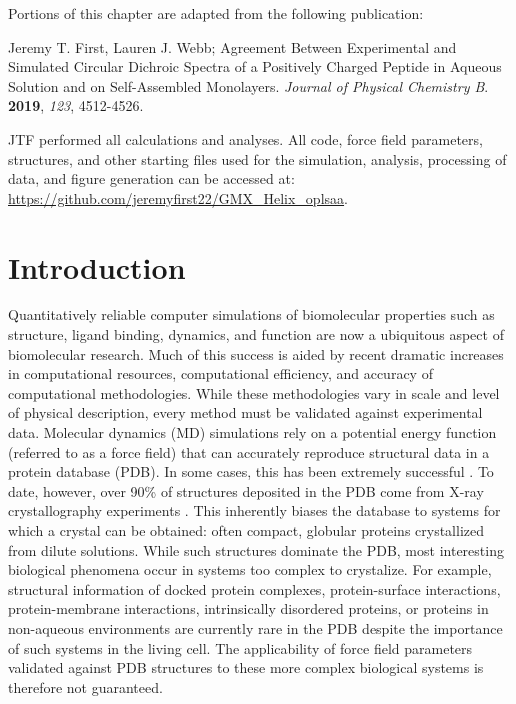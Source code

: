 Portions of this chapter are adapted from the following publication: 

\noindent Jeremy T. First, Lauren J. Webb; Agreement Between Experimental and Simulated Circular Dichroic Spectra of a Positively Charged Peptide in Aqueous Solution and on Self-Assembled Monolayers. \emph{Journal of Physical Chemistry B}. \textbf{2019}, \emph{123}, 4512-4526.

JTF performed all calculations and analyses. 
All code, force field parameters, structures, and other starting files used for the simulation, analysis, processing of data, and figure generation can be accessed at:
\url{https://github.com/jeremyfirst22/GMX_Helix_oplsaa}. 

\section{Introduction}

Quantitatively reliable computer simulations of biomolecular properties such as structure, ligand binding, dynamics, and function are now a ubiquitous aspect of biomolecular research. 
Much of this success is aided by recent dramatic increases in computational resources, computational efficiency, and accuracy of computational methodologies. 
While these methodologies vary in scale and level of physical description, every method must be validated against experimental data. 
Molecular dynamics (MD) simulations rely on a potential energy function (referred to as a force field) that can accurately reproduce structural data in a protein database (PDB). 
In some cases, this has been extremely successful \cite{Duan1998, Lindorff-Larsen2011, Bowman2011, Voelz2012, Shaw2010, Lane2013, Koukos2014a}.
To date, however, over 90\% of structures deposited in the PDB come from X-ray crystallography experiments \cite{Berman2000}. 
This inherently biases the database to systems for which a crystal can be obtained: often compact, globular proteins crystallized from dilute solutions. 
While such structures dominate the PDB, most interesting biological phenomena occur in systems too complex to crystalize. 
For example, structural information of docked protein complexes, protein-surface interactions, protein-membrane interactions, intrinsically disordered proteins, or proteins in non-aqueous environments are currently rare in the PDB\cite{Berman2013} despite the importance of such systems in the living cell. 
The applicability of force field parameters validated against PDB structures to these more complex biological systems is therefore not guaranteed.

